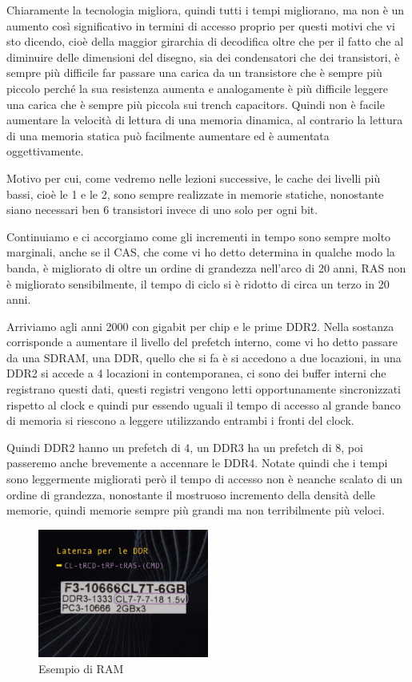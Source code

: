Chiaramente la tecnologia migliora, quindi tutti i tempi migliorano, ma non è un aumento così significativo in termini di accesso proprio per questi motivi che vi sto dicendo, cioè della maggior girarchia di decodifica oltre che per il fatto che al diminuire delle dimensioni del disegno, sia dei condensatori che dei transistori, è sempre più difficile far passare una carica da un transistore che è sempre più piccolo perché la sua resistenza aumenta e analogamente è più difficile leggere una carica che è sempre più piccola sui trench capacitors.
Quindi non è facile aumentare la velocità di lettura di una memoria dinamica, al contrario la lettura di una memoria statica può facilmente aumentare ed è aumentata oggettivamente.

Motivo per cui, come vedremo nelle lezioni successive, le cache dei livelli più bassi, cioè le 1 e le 2, sono sempre realizzate in memorie statiche, nonostante siano necessari ben 6 transistori invece di uno solo per ogni bit.

Continuiamo e ci accorgiamo come gli incrementi in tempo sono sempre molto marginali, anche se il CAS, che come vi ho detto determina in qualche modo la banda, è migliorato di oltre un ordine di grandezza nell'arco di 20 anni, RAS non è migliorato sensibilmente, il tempo di ciclo si è ridotto di circa un terzo in 20 anni.

Arriviamo agli anni 2000 con gigabit per chip e le prime DDR2.
Nella sostanza corrisponde a aumentare il livello del prefetch interno, come vi ho detto passare da una SDRAM, una DDR, quello che si fa è si accedono a due locazioni, in una DDR2 si accede a 4 locazioni in contemporanea, ci sono dei buffer interni che registrano questi dati, questi registri vengono letti opportunamente sincronizzati rispetto al clock e quindi pur essendo uguali il tempo di accesso al grande banco di memoria si riescono a leggere utilizzando entrambi i fronti del clock.

Quindi DDR2 hanno un prefetch di 4, un DDR3 ha un prefetch di 8, poi passeremo anche brevemente a accennare le DDR4.
Notate quindi che i tempi sono leggermente migliorati però il tempo di accesso non è neanche scalato di un ordine di grandezza, nonostante il mostruoso incremento della densità delle memorie, quindi memorie sempre più grandi ma non terribilmente più veloci.

\FloatBarrier
\begin{figure}[H]
  \centering
  \includegraphics[width=0.50\textwidth,
                    trim=40 40 40 40, %
                    clip]
                    {images/Lez05_p02_fig_01.png}
  \caption{Esempio di RAM}
  \label{fig:Lez05_p02_fig_01}
\end{figure}
\FloatBarrier
\noindent

